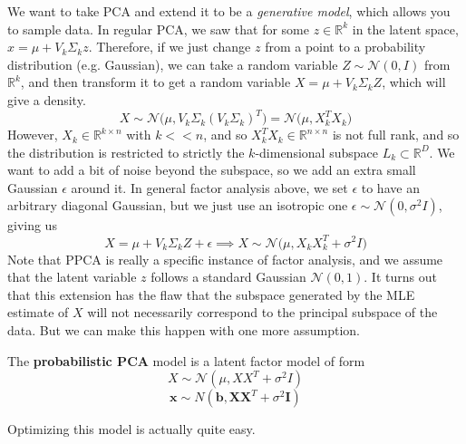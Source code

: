   We want to take PCA and extend it to be a \textit{generative model}, which allows you to sample data. In regular PCA, we saw that for some $z \in \mathbb{R}^k$ in the latent space, $\hat{x} = \mu + V_k \Sigma_k z$. Therefore, if we just change $z$ from a point to a probability distribution (e.g. Gaussian), we can take a random variable $Z \sim \mathcal{N}(0, I)$ from $\mathbb{R}^k$, and then transform it to get a random variable $X = \mu + V_k \Sigma_k Z$, which will give a density. 
  \begin{equation}
    X \sim \mathcal{N} \big( \mu, V_k \Sigma_k (V_k \Sigma_k)^T \big) = \mathcal{N} \big( \mu, X_k^T X_k)
  \end{equation} 
  However, $X_k \in \mathbb{R}^{k \times n}$ with $k << n$, and so $X_k^T X_k \in \mathbb{R}^{n \times n}$ is not full rank, and so the distribution is restricted to strictly the $k$-dimensional subspace $L_k \subset \mathbb{R}^D$. We want to add a bit of noise beyond the subspace, so we add an extra small Gaussian $\epsilon$ around it. In general factor analysis above, we set $\epsilon$ to have an arbitrary diagonal Gaussian, but we just use an isotropic one $\epsilon \sim \mathcal{N}(0, \sigma^2 I )$, giving us 
  \begin{equation}
    X = \mu + V_k \Sigma_k Z + \epsilon \implies X \sim \mathcal{N} \big( \mu, X_k X_k^T + \sigma^2 I)
  \end{equation} 
  Note that PPCA is really a specific instance of factor analysis, and we assume that the latent variable $z$ follows a standard Gaussian $\mathcal{N}(0, 1)$. It turns out that this extension has the flaw that the subspace generated by the MLE estimate of $X$ will not necessarily correspond to the principal subspace of the data. But we can make this happen with one more assumption. 

  \begin{definition} 
    The \textbf{probabilistic PCA} model is a latent factor model of form  
    \begin{equation}
      X \sim \mathcal{N}(\mu, X X^T + \sigma^2 I) 
    \end{equation}
    \begin{equation}
      \mathbf{x} \sim N(\mathbf{b}, \mathbf{X}\mathbf{X}^T + \sigma^2 \mathbf{I})
    \end{equation}
  \end{definition} 

  Optimizing this model is actually quite easy. 

